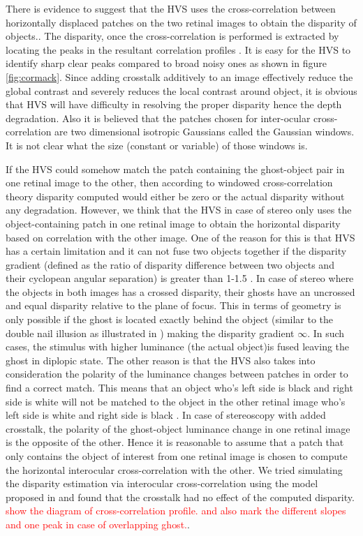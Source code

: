 There is evidence to suggest that the HVS uses the cross-correlation between horizontally displaced patches on the two retinal images to obtain the disparity of objects.\cite{filippini2009limits}\cite{kane2014limits}. The disparity, once the cross-correlation is performed is extracted by locating the peaks in the resultant correlation profiles \cite{cormack1991interocular}. It is easy for the HVS to identify sharp clear peaks compared to broad noisy ones as shown in figure \ref{fig:cormack}. Since adding crosstalk additively to an image effectively reduce the global contrast and severely reduces the local contrast around object, it is obvious that HVS will have difficulty in resolving the proper disparity hence the depth degradation. Also it is believed that the patches chosen for inter-ocular cross-correlation are two dimensional isotropic Gaussians\cite{filippini2009limits} called the Gaussian windows. It is not clear what the size (constant or variable) of those windows is.

If the HVS could somehow match the patch containing the ghost-object pair in one retinal image to the other, then according to windowed cross-correlation theory disparity computed would either be zero or the actual disparity without any degradation. However, we think that the HVS in case of stereo only uses the object-containing patch in one retinal image to obtain the horizontal disparity based on correlation with the other image. One of the reason for this is that HVS has a certain limitation and it can not fuse two objects together if the disparity gradient (defined as the ratio of disparity difference between two objects and their cyclopean angular separation) is greater than 1-1.5 \cite{howard1995binocular} \cite{kane2014limits}. In case of stereo where the objects in both images has a crossed disparity, their ghosts have an uncrossed and equal disparity relative to the plane of focus. This in terms of geometry is only possible if the ghost is located exactly behind the object (similar to the double nail illusion as illustrated in \cite{tsirlin2012effect} \cite{krol1980double}) making the disparity gradient $\infty$. In such cases, the stimulus with higher luminance (the actual object)is fused leaving the ghost in diplopic state. The other reason is that the HVS also takes into consideration the polarity of the luminance changes between patches in order to find a correct match. This means that an object who's left side is black and right side is white will not be matched to the object in the other retinal image who's left side is white and right side is black \cite{howard1995binocular}. In case of stereoscopy with added crosstalk, the polarity of the ghost-object luminance change in one retinal image is the opposite of the other. Hence it is reasonable to assume that a patch that only contains the object of interest from one retinal image is chosen to compute the horizontal interocular cross-correlation with the other. We tried simulating the disparity estimation via interocular cross-correlation using the model proposed in \cite{filippini2009limits} and found that the crosstalk had no effect of the computed disparity. \textcolor{red}{show the diagram of cross-correlation profile. and also mark the different slopes and one peak in case of overlapping ghost.}.

